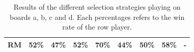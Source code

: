\documentclass{article}
\begin{document}
\begin{table}[t]
\begin{tabular}{|c||c|c|c|c|c|c|c|c|}
        RM & 52\% & 47\% & 52\% & 70\% & 44\% & 50\% & 58\% &    - \\ \hline 
\end{tabular}
\caption{Results of the different selection strategies playing on boards a, b, c and d. 
Each percentages refers to the win rate of the row player. \label{table:round_robin}}
\end{table}
\end{document}
